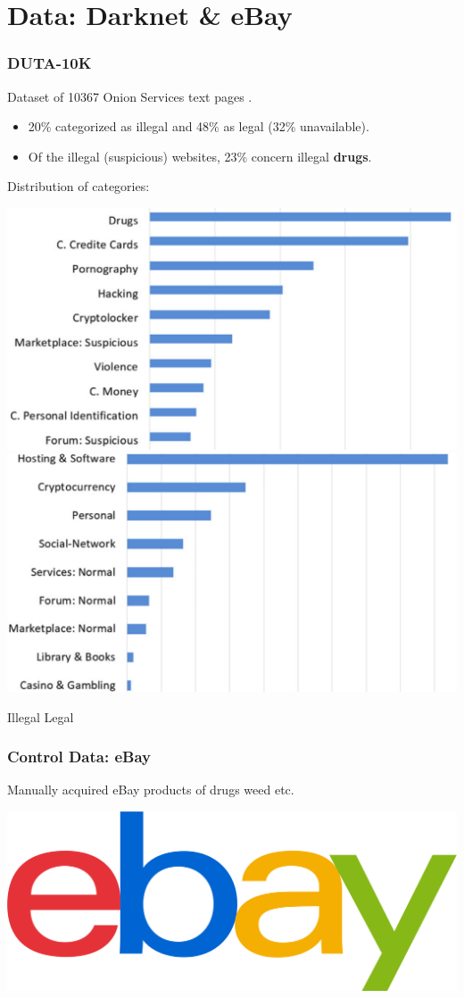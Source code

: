 \documentclass[t,xcolor={svgnames,table}]{beamer}
\begin{document}
\section{Data: Darknet \& eBay}

\begin{frame}
	\frametitle{DUTA-10K}
	
	Dataset of 10367 Onion Services text pages \cite{AlNabki19}.

	\begin{itemize}\setlength\itemsep{1em}
		\item 20\% categorized as illegal and 48\% as legal (32\% unavailable).
		\item Of the illegal (suspicious) websites, 23\% concern illegal \textbf{drugs}.
	\end{itemize}
	\vfill
	\pause

	Distribution of categories:
	
	\includegraphics[width=.49\textwidth]{suspicious.png}\hfill\includegraphics[width=.49\textwidth]{normal.png}
	
	\hspace{2cm} Illegal \hspace{5cm} Legal
\end{frame}

\begin{frame}
	\frametitle{Control Data: eBay}
	Manually acquired eBay products of drugs weed etc. %
	\vfill
	
	\begin{center}
	\includegraphics[width=.5\textwidth]{ebay.png}
	\end{center}
\end{frame}
\end{document}
